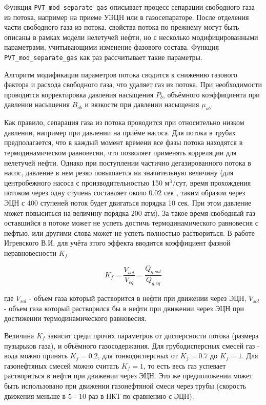 Функция \texttt{PVT_mod_separate_gas} описывает процесс сепарации свободного газа из потока, например на приеме УЭЦН или в газосепараторе.
После отделения части свободного газа из потока, свойства потока по прежнему могут быть описаны в рамках модели нелетучей нефти, но с несколько модифицированными параметрами, учитывающими изменение фазового состава. Функция \texttt{PVT_mod_separate_gas} как раз рассчитывает такие параметры.

Алгоритм модификации параметров потока сводится к снижению газового фактора и расхода свободного газа, что удаляет газ из потока. При необходимости проводится корректировка давления насыщения $P_b$, объёмного коэффициента при давлении насыщения $B_{ob}$ и вязкости при давлении насыщения $\mu_{ob}$. 

Как правило, сепарация газа из потока проводится при относительно низком давлении, например при давлении на приёме насоса. Для потока в трубах предполагается, что  в каждый момент времени все фазы потока находятся в термодинамическом равновесии, что позволяет применять корреляции для нелетучей нефти.  Однако при поступлении частично дегазированного потока в насос, давление в нем резко повышается на значительную величину (для центробежного насоса с производительностью 150 м$^3$/сут, время прохождения потоком через одну ступень составляет около 0.02 сек \cite{diss_Igrevesky_ESP_gas}, таким образом через ЭЦН с 400 ступеней поток будет двигаться порядка 10 сек. При этом давление может повыситься на величину порядка 200 атм). За такое время свободный газ оставшийся в потоке может не успеть достичь термодинамического равновесия с нефтью, или другими слова может не успеть полностью раствориться. В работе Игревского В.И. \cite{diss_Igrevesky_ESP_gas} для учёта этого эффекта вводится коэффициент фазной неравновесности $K_f$

$$K_f = \frac{V_{sol}}{V_{eq}}= \frac{Q_{g.sol}}{Q_{g.eq}}$$

где  $V_{sol}$ - объем газа который растворится в нефти при движении через ЭЦН, $V_{sol}$ - объем газа который растворился бы в нефти при движении через ЭЦН при достижении термодинамического равновесия. 

Величина $K_f$ зависит среди прочих параметров от дисперсности потока (размера пузырьков газа), и объёмного газосодержания.  Для грубодисперсных смесей газ - вода можно принять $K_f=0.2$, для тонкодисперсных от $K_f=0.7$ до $K_f=1$. Для газонефтяных смесей можно считать $K_f=1$, то есть весь газ успевает раствориться в нефти при движении через ЭЦН. Это же предположении может быть использовано при движении газонефтяной смеси через трубы (скорость движения меньше в 5 - 10 раз в НКТ по сравнению с ЭЦН).

